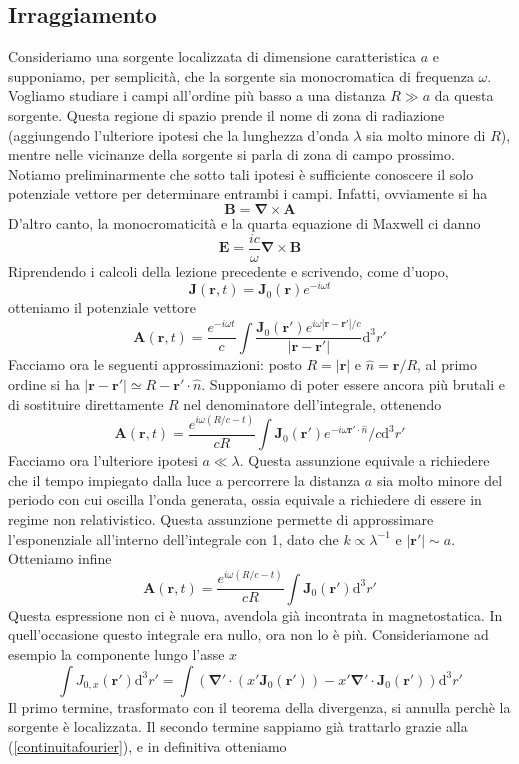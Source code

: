 \documentclass[a4paper,11pt]{book}
\newcommand{\dif}{\mathrm{d}}
\let\oldnabla\nabla
\renewcommand{\nabla}{\vec{\oldnabla}}
\renewcommand{\vec}[1]{\mathbf{#1}}
\theoremstyle{theorem}
\theoremstyle{definition}
\begin{document}
\subsection{Irraggiamento}
Consideriamo una sorgente localizzata di dimensione caratteristica $a$ e supponiamo, per semplicità, che la sorgente sia monocromatica di frequenza $\omega$. Vogliamo studiare i campi all'ordine più basso a una distanza $R\gg a$ da questa sorgente. Questa regione di spazio prende il nome di zona di radiazione (aggiungendo l'ulteriore ipotesi che la lunghezza d'onda $\lambda$ sia molto minore di $R$), mentre nelle vicinanze della sorgente si parla di zona di campo prossimo. Notiamo preliminarmente che sotto tali ipotesi è sufficiente conoscere il solo potenziale vettore per determinare entrambi i campi. Infatti, ovviamente si ha
\[\vec{B}=\nabla\times\vec{A}\]
D'altro canto, la monocromaticità e la quarta equazione di Maxwell ci danno 
\[\vec{E}=\frac{ic}{\omega}\nabla\times\vec{B}\]
Riprendendo i calcoli della lezione precedente e scrivendo, come d'uopo,
\[\vec{J}(\vec{r},t)=\vec{J}_0(\vec{r})e^{-i\omega t}\]
otteniamo il potenziale vettore
\[\vec{A}(\vec{r},t)=\frac{e^{-i\omega t}}{c}\int\frac{\vec{J}_0(\vec{r}')e^{i\omega|\vec{r}-\vec{r}'|/c}}{|\vec{r}-\vec{r}'|}\dif^3r'\]
Facciamo ora le seguenti approssimazioni: posto $R=|\vec{r}|$ e $\hat{n}=\vec{r}/R$, al primo ordine si ha $|\vec{r}-\vec{r}'|\simeq R-\vec{r}'\cdot\hat{n}$. Supponiamo di poter essere ancora più brutali e di sostituire direttamente $R$ nel denominatore dell'integrale, ottenendo
\[\vec{A}(\vec{r},t)=\frac{e^{i\omega(R/c-t)}}{cR}\int\vec{J}_0(\vec{r}')e^{-i\omega\vec{r}'\cdot\hat{n}}/c\dif^3r'\]
Facciamo ora l'ulteriore ipotesi $a\ll\lambda$. Questa assunzione equivale a richiedere che il tempo impiegato dalla luce a percorrere la distanza $a$ sia molto minore del periodo con cui oscilla l'onda generata, ossia equivale a richiedere di essere in regime non relativistico. Questa assunzione permette di approssimare l'esponenziale all'interno dell'integrale con 1, dato che $k\propto\lambda^{-1}$ e $|\vec{r}'|\sim a$. Otteniamo infine
\[\vec{A}(\vec{r},t)=\frac{e^{i\omega(R/c-t)}}{cR}\int\vec{J}_0(\vec{r}')\dif^3r'\]
Questa espressione non ci è nuova, avendola già incontrata in magnetostatica. In quell'occasione questo integrale era nullo, ora non lo è più. Consideriamone ad esempio la componente lungo l'asse $x$
\[\int J_{0,x}(\vec{r}')\dif^3r'=\int\left(\nabla'\cdot(x'\vec{J}_0(\vec{r}'))-x'\nabla'\cdot\vec{J}_0(\vec{r}')\right)\dif^3r'\]
Il primo termine, trasformato con il teorema della divergenza, si annulla perchè la sorgente è localizzata. Il secondo termine sappiamo già trattarlo grazie alla (\ref{continuitafourier}), e in definitiva otteniamo
\end{document}
